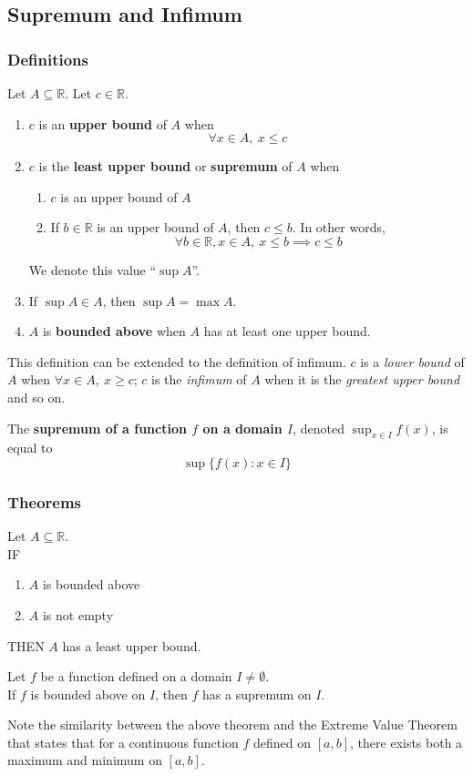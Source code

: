 \documentclass[10pt]{article}
\def\R{{\mathbb R}}
\newenvironment{definition}[1][]{\begin{tcolorbox}[colframe=_orange,colback=_orange2,title=Definition. \ifthenelse{\isempty{#1}}{}{(#1)}
]}{\end{tcolorbox}}
\newenvironment{theorem}[1][]{\begin{tcolorbox}[colframe=_blue,colback=_blue2,title=Theorem. \ifthenelse{\isempty{#1}}{}{(#1)}
]}{\end{tcolorbox}}
\begin{document}
\subsection{Supremum and Infimum}
\subsubsection{Definitions}
\begin{definition}
    Let $A\subseteq\R$. Let $c\in\R$.
    \begin{enumerate}
        \item $c$ is an \textbf{upper bound} of $A$ when
              $$\forall x\in A,~x\leq c$$
        \item $c$ is the \textbf{least upper bound} or \textbf{supremum} of $A$ when
              \begin{enumerate}
                  \item $c$ is an upper bound of $A$
                  \item If $b\in\R$ is an upper bound of $A$, then $c\leq b$. In other words,
                        $$
                            \forall b\in\R, x\in A,~x\leq b\implies c\leq b
                        $$
              \end{enumerate}
              We denote this value ``$\sup A$''.
        \item If $\sup A\in A$, then $\sup A=\max A$.
        \item $A$ is \textbf{bounded above} when $A$ has at least one upper bound.
    \end{enumerate}
\end{definition}
This definition can be extended to the definition of infimum. $c$ is a \textit{lower bound} of $A$ when $\forall x\in A,~x\geq c$; $c$ is the \textit{infimum} of $A$ when it is the \textit{greatest upper bound} and so on.
\begin{definition}[Supremum of a Function]
    The \textbf{supremum of a function $f$ on a domain $I$}, denoted {\small$\displaystyle\sup_{x\in I}f(x)$}, is equal to
    $$
        \sup\{f(x):x\in I\}
    $$
\end{definition}
\subsubsection{Theorems}
\begin{theorem}[Lowest Upper Bound Principle]
    Let $A\subseteq\R$. \\
    IF
    \begin{enumerate}
        \item $A$ is bounded above
        \item $A$ is not empty
    \end{enumerate}
    THEN $A$ has a least upper bound.
\end{theorem}
\begin{theorem}
    Let $f$ be a function defined on a domain $I\neq \emptyset$.\\If $f$ is bounded above on $I$, then $f$ has a supremum on $I$.
\end{theorem}
Note the similarity between the above theorem and the Extreme Value Theorem that states that for a continuous function $f$ defined on $[a,b]$, there exists both a maximum and minimum on $[a,b]$.
\end{document}
